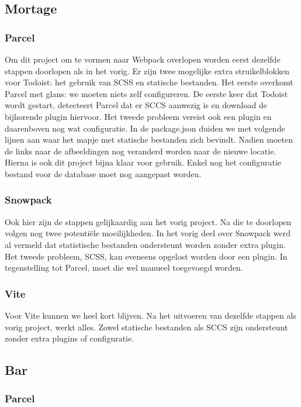 \subsection{Mortage}

\subsubsection{Parcel}
Om dit project om te vormen naar Webpack overlopen worden eerst dezelfde stappen doorlopen als in het vorig. Er zijn twee mogelijke extra struikelblokken voor Todoist: het gebruik van SCSS en statische bestanden. Het eerste overkomt Parcel met glans: we moeten niets zelf configureren. De eerste keer dat Todoist wordt gestart, detecteert Parcel dat er SCCS aanwezig is en download de bijhorende plugin hiervoor. Het tweede probleem vereist ook een plugin en daarenboven nog wat configuratie. In de package.json duiden we met volgende lijnen aan waar het mapje met statische bestanden zich bevindt. Nadien moeten de links naar de afbeeldingen nog veranderd worden naar de nieuwe locatie. Hierna is ook dit project bijna klaar voor gebruik. Enkel nog het configuratie bestand voor de database moet nog aangepast worden.

\subsubsection{Snowpack}
Ook hier zijn de stappen gelijkaardig aan het vorig project. Na die te doorlopen volgen nog twee potentiële moeilijkheden. In het vorig deel over Snowpack werd al vermeld dat statistische bestanden ondersteunt worden zonder extra plugin. Het tweede probleem, SCSS, kan eveneens opgelost worden door een plugin. In tegenstelling tot Parcel, moet die wel manueel toegevoegd worden. 

\subsubsection{Vite}
Voor Vite kunnen we heel kort blijven. Na het uitvoeren van dezelfde stappen als vorig project, werkt alles. Zowel statische bestanden als SCCS zijn ondersteunt zonder extra plugins of configuratie.

\subsection{Bar}

\subsubsection{Parcel}

